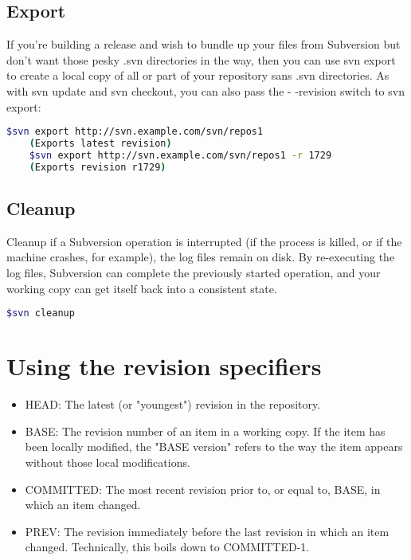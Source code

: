 \documentclass{article}
\begin{document}
\subsection{Export}
If you're building a release and wish to bundle up your files from Subversion but don't want those pesky .svn directories in the way, then you can use svn export to create a local copy of all or part of your repository sans .svn directories. As with svn update and svn checkout, you can also pass the - -revision switch to svn export:
\begin{lstlisting}[language=BASH]
    $svn export http://svn.example.com/svn/repos1
    (Exports latest revision)
    $svn export http://svn.example.com/svn/repos1 -r 1729
    (Exports revision r1729) 
\end{lstlisting}

\subsection{Cleanup}
Cleanup if a Subversion operation is interrupted (if the process is killed, or if the machine crashes, for example), the log files remain on disk. By re-executing the log files, Subversion can complete the previously started operation, and your working copy can get itself back into a consistent state.
\begin{lstlisting}[language=BASH]
    $svn cleanup
\end{lstlisting}

\section{Using the revision specifiers}

\begin{itemize}
\item HEAD: The latest (or "youngest") revision in the repository.
\item BASE: The revision number of an item in a working copy. If the item has been locally modified, the "BASE version" refers to the way the item appears without those local modifications.
\item COMMITTED: The most recent revision prior to, or equal to, BASE, in which an item changed.
\item PREV: The revision immediately before the last revision in which an item changed. Technically, this boils down to COMMITTED-1.
\end{itemize}
\end{document}
